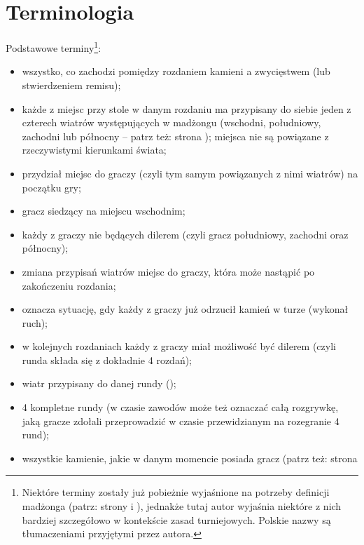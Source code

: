 \section{Terminologia}
\label{terminologia}
Podstawowe terminy\footnote{Niektóre terminy zostały już pobieżnie
wyjaśnione na potrzeby definicji madżonga (patrz: strony \pageref{zastrzezenia}
i \pageref{definicja}), jednakże tutaj autor wyjaśnia niektóre z nich bardziej
szczegółowo w kontekście zasad turniejowych. Polskie nazwy są tłumaczeniami
przyjętymi przez autora.}:
\begin{itemize}
\item {}
wszystko, co zachodzi pomiędzy rozdaniem kamieni
a zwycięstwem (lub stwierdzeniem remisu);
\item {}
każde z miejsc przy stole w danym rozdaniu ma przypisany do siebie jeden z
czterech wiatrów występujących w madżongu (wschodni, południowy, zachodni lub
północny -- patrz też: strona \pageref{wiatry}); miejsca nie są powiązane z
rzeczywistymi kierunkami świata;
\item {}
przydział miejsc do graczy (czyli tym samym powiązanych z nimi wiatrów) na
początku gry;
\item {}
gracz siedzący na miejscu wschodnim;
\item {}
każdy z graczy nie będących dilerem (czyli gracz południowy, zachodni oraz
północny);
\item {}
zmiana przypisań wiatrów miejsc do graczy, która może nastąpić po zakończeniu
rozdania;
  \item {}
  oznacza sytuację, gdy każdy z graczy już odrzucił
  kamień w turze (wykonał ruch);
\item {}
w kolejnych rozdaniach każdy z graczy miał
możliwość być dilerem (czyli runda składa się z dokładnie 4 rozdań);
\item {}
wiatr przypisany do danej rundy (\wiatry);
\item {}
4 kompletne rundy (w czasie zawodów może
też oznaczać całą rozgrywkę, jaką gracze zdołali przeprowadzić w czasie
przewidzianym na rozegranie 4 rund);
\item {}	%
wszystkie kamienie, jakie w danym momencie posiada gracz (patrz też: strona

\end{itemize}
